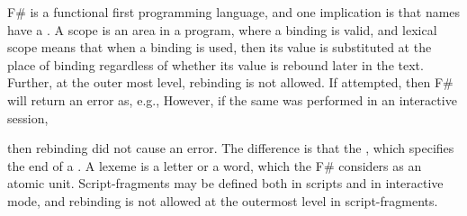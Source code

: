 F\# is a functional first programming language, and one implication is that names have a . A scope is an area in a program, where a binding is valid, and lexical scope means that when a binding is used, then its value is substituted at the place of binding regardless of whether its value is rebound later in the text. Further, at the outer most level, rebinding is not allowed. If attempted, then F\# will return an error as, e.g., 
%
%
However, if the same was performed in an interactive session,
%



%
then rebinding did not cause an error. The difference is that the \idx{\lexeme{;;}} , which specifies the end of a . A lexeme is a letter or a word, which the F\# considers as an atomic unit. Script-fragments may be defined both in scripts and in interactive mode, and rebinding is not allowed at the outermost level in script-fragments.

